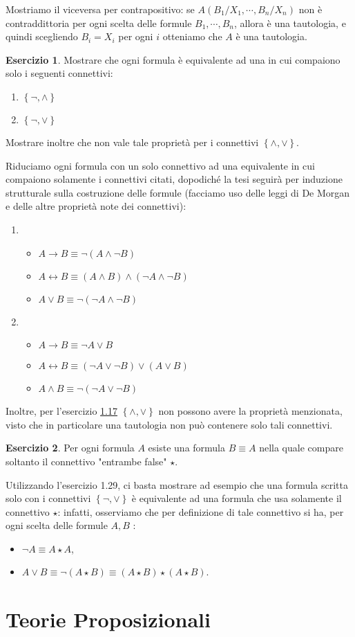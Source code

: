 \documentclass[a4paper]{article}
\newcommand{\limplies}{\rightarrow}
\newcommand{\liff}{\leftrightarrow}
\theoremstyle{definition}
\theoremstyle{definition}
\theoremstyle{remark}
\theoremstyle{definition}
\newtheorem{exercise}{Esercizio}[section]
\begin{document}
Mostriamo il viceversa per contrapositivo: se $A\left( B_1\slash X_1,\cdots, B_n\slash X_n \right)$ non è
contraddittoria per ogni scelta delle formule $B_1,\cdots,B_n$, allora è una tautologia, e quindi scegliendo $B_i=X_i$ per ogni $i$ otteniamo che $A$ è una tautologia.
\setcounter{exercise}{28}
\begin{exercise}
	Mostrare che ogni formula è equivalente ad una in cui compaiono solo i seguenti connettivi:
	\begin{enumerate}
		\item $\left\{ \lnot,\land \right\}$
		\item $\left\{ \lnot,\lor \right\}$
	\end{enumerate}
	Mostrare inoltre che non vale tale proprietà per i connettivi $\left\{ \land,\lor \right\}$.
\end{exercise}
\noindent
Riduciamo ogni formula con un solo connettivo ad una equivalente in cui compaiono solamente i connettivi citati, dopodiché la tesi seguirà per induzione strutturale sulla
costruzione delle formule (facciamo uso delle leggi di De Morgan e delle altre proprietà note dei connettivi):
\begin{enumerate}
	\item
		\begin{itemize}
			\item $A\limplies B\equiv\lnot\left( A\land\lnot B \right)$
			\item $A\liff B\equiv \left( A\land B \right) \land \left( \lnot A \land\lnot B \right) $
			\item $A\lor B\equiv\lnot\left( \lnot A \land \lnot B \right) $
		\end{itemize}
	\item
		\begin{itemize}
			\item $A\limplies B\equiv\lnot A\lor B$
			\item $A\liff B\equiv \left( \lnot A\lor \lnot B \right) \lor \left( A \lor B \right) $
			\item $A\land B\equiv\lnot\left( \lnot A \lor\lnot B \right) $
		\end{itemize}
\end{enumerate}
Inoltre, per l'esercizio \hyperref[connettivi]{1.17} $\left\{ \land,\lor \right\} $ non possono avere la proprietà menzionata, visto che in particolare una tautologia non può contenere solo tali connettivi.
\setcounter{exercise}{30}
\begin{exercise}
	Per ogni formula $A$ esiste una formula $B\equiv A$ nella quale compare soltanto il connettivo "entrambe false" $\star$.
\end{exercise}
Utilizzando l'esercizio 1.29, ci basta mostrare ad esempio che una formula scritta solo con i connettivi $\left\{ \lnot,\lor \right\}$ è equivalente ad una formula che usa solamente il connettivo $\star$: infatti, osserviamo che per
definizione di tale connettivo si ha, per ogni scelta delle formule $A,B$ :
\begin{itemize}
	\item $\lnot A\equiv A\star A$,
	\item $A\lor B\equiv\lnot\left( A\star B \right) \equiv \left( A\star B \right) \star\left( A\star B \right) $.
\end{itemize}
\section{Teorie Proposizionali}
\end{document}
